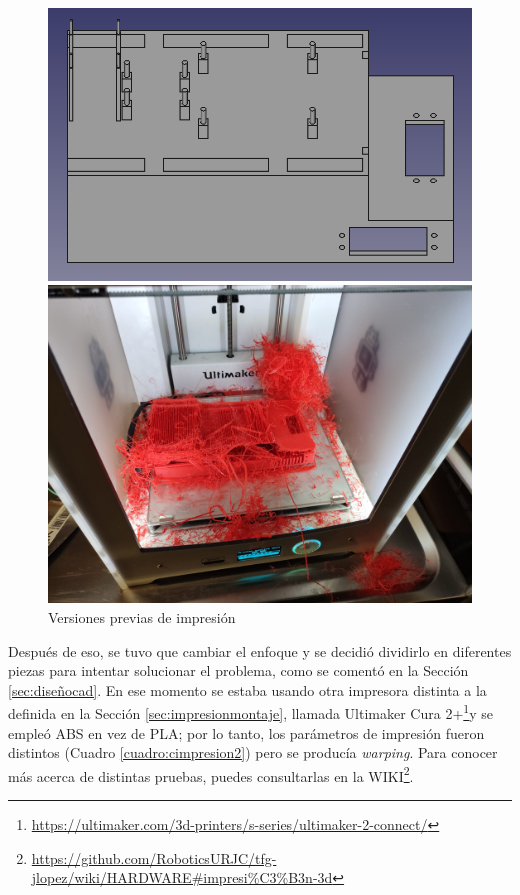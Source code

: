 \begin{figure}[ht!]
	\centering
	\begin{minipage}{0.45\linewidth}
		\centering
		\includegraphics[width=\linewidth]{figs/cap7/impresionfallida1.png}
	\end{minipage}
	\hspace{1cm}
	\begin{minipage}{0.40\linewidth}
		\centering
		\includegraphics[width=\linewidth]{figs/cap7/piezav1error.jpeg}
	\end{minipage}
	\caption{Versiones previas de impresión}
	\label{fig:imfallida}
\end{figure}


Después de eso, se tuvo que cambiar el enfoque y se decidió dividirlo en diferentes piezas para intentar solucionar el problema, como se comentó en la Sección \ref{sec:diseñocad}. En ese momento se estaba usando otra impresora distinta a la definida en la Sección \ref{sec:impresionmontaje}, llamada Ultimaker Cura 2+\footnote{\url{https://ultimaker.com/3d-printers/s-series/ultimaker-2-connect/}}y se empleó ABS en vez de PLA; por lo tanto, los parámetros de impresión fueron distintos (Cuadro \ref{cuadro:cimpresion2}) pero se producía \textit{warping}. Para conocer más acerca de distintas pruebas, puedes consultarlas en la WIKI\footnote{\url{https://github.com/RoboticsURJC/tfg-jlopez/wiki/HARDWARE\#impresi\%C3\%B3n-3d}}.

